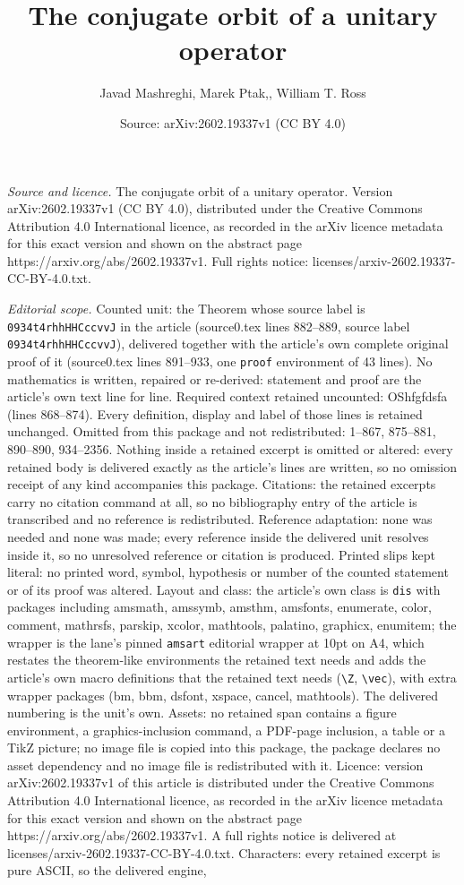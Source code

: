 \documentclass[10pt,a4paper]{amsart}
\title[The conjugate orbit of a unitary operator]{The conjugate orbit of a unitary operator}
\author{Javad Mashreghi, Marek Ptak,, William T. Ross}
\date{Source: arXiv:2602.19337v1 (CC BY 4.0)}
\begin{document}
\maketitle

\noindent\emph{Source and licence.} The conjugate orbit of a unitary operator. Version arXiv:2602.19337v1 (CC BY 4.0), distributed under the Creative Commons Attribution 4.0 International licence, as recorded in the arXiv licence metadata for this exact version and shown on the abstract page https://arxiv.org/abs/2602.19337v1. Full rights notice: licenses/arxiv-2602.19337-CC-BY-4.0.txt.\par\smallskip

\noindent\textit{Editorial scope.} Counted unit: the Theorem whose source label is \texttt{0934t4rhhHHCccvvJ} in the article (source0.tex lines 882--889, source label \texttt{0934t4rhhHHCccvvJ}), delivered together with the article's own complete original proof of it (source0.tex lines 891--933, one \texttt{proof} environment of 43 lines). No mathematics is written, repaired or re-derived: statement and proof are the article's own text line for line. Required context retained uncounted: OShfgfdsfa (lines 868--874). Every definition, display and label of those lines is retained unchanged. Omitted from this package and not redistributed: 1--867, 875--881, 890--890, 934--2356. Nothing inside a retained excerpt is omitted or altered: every retained body is delivered exactly as the article's lines are written, so no omission receipt of any kind accompanies this package. Citations: the retained excerpts carry no citation command at all, so no bibliography entry of the article is transcribed and no reference is redistributed. Reference adaptation: none was needed and none was made; every reference inside the delivered unit resolves inside it, so no unresolved reference or citation is produced. Printed slips kept literal: no printed word, symbol, hypothesis or number of the counted statement or of its proof was altered. Layout and class: the article's own class is \texttt{dis} with packages including amsmath, amssymb, amsthm, amsfonts, enumerate, color, comment, mathrsfs, parskip, xcolor, mathtools, palatino, graphicx, enumitem; the wrapper is the lane's pinned \texttt{amsart} editorial wrapper at 10pt on A4, which restates the theorem-like environments the retained text needs and adds the article's own macro definitions that the retained text needs (\texttt{\textbackslash Z}, \texttt{\textbackslash vec}), with extra wrapper packages (bm, bbm, dsfont, xspace, cancel, mathtools). The delivered numbering is the unit's own. Assets: no retained span contains a figure environment, a graphics-inclusion command, a PDF-page inclusion, a table or a TikZ picture; no image file is copied into this package, the package declares no asset dependency and no image file is redistributed with it. Licence: version arXiv:2602.19337v1 of this article is distributed under the Creative Commons Attribution 4.0 International licence, as recorded in the arXiv licence metadata for this exact version and shown on the abstract page https://arxiv.org/abs/2602.19337v1. A full rights notice is delivered at licenses/arxiv-2602.19337-CC-BY-4.0.txt. Characters: every retained excerpt is pure ASCII, so the delivered engine, 
\end{document}
